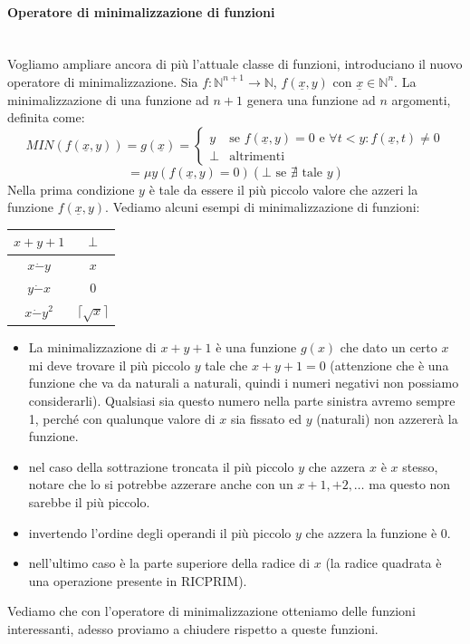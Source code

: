 \documentclass{article}
\begin{document}
\paragraph{Operatore di minimalizzazione di funzioni}\mbox{}\\
Vogliamo ampliare ancora di più l'attuale classe di funzioni, introduciano il nuovo operatore
di minimalizzazione.
Sia $f:\mathbb{N}^{n+1}\rightarrow\mathbb{N}$, $f(\underline{x},y)$ con
$\underline{x}\in\mathbb{N}^n$. La minimalizzazione di una funzione ad $n+1$ genera una
funzione ad $n$ argomenti, definita come:
\[
    MIN(f(\underline{x},y))=g(\underline{x})=
    \begin{cases}
        y    & \text{se }f(\underline{x},y)=0\text{ e }\forall t<y:f(\underline{x},t)\neq 0 \\
        \bot & \text{altrimenti}
    \end{cases}
\]
$$= \mu y(f(\underline{x},y)=0) (\bot\text{ se }\nexists \text{ tale }y)$$
Nella prima condizione $y$ è tale da essere il più piccolo valore
che azzeri la funzione $f(\underline{x},y)$. Vediamo alcuni esempi di minimalizzazione
di funzioni:
\begin{center}
    \begin{tabular}{c|c}
        \toprule
        $x+y+1$       & $\bot$                 \\
        \midrule
        $x\dot{-}y$   & $x$                    \\
        \midrule
        $y\dot{-}x$   & $0$                    \\
        \midrule
        $x\dot{-}y^2$ & $\lceil\sqrt{x}\rceil$ \\
        \bottomrule
    \end{tabular}
\end{center}

\begin{itemize}
    \item La minimalizzazione di $x+y+1$ è una funzione $g(x)$ che dato un certo $x$ mi deve
          trovare il più piccolo $y$ tale che $x+y+1=0$ (attenzione che è una funzione
          che va da naturali a naturali, quindi i numeri negativi non possiamo considerarli).
          Qualsiasi sia questo numero nella parte sinistra avremo sempre 1, perché con qualunque
          valore di $x$ sia fissato ed $y$ (naturali) non azzererà la funzione.

    \item nel caso della sottrazione troncata il più piccolo $y$ che azzera $x$ è $x$ stesso,
          notare che lo si potrebbe azzerare anche con un $x+1,+2,\dots$ ma questo non sarebbe il più piccolo.

    \item invertendo l'ordine degli operandi il più piccolo $y$ che azzera la funzione è 0.

    \item nell'ultimo caso è la parte superiore della radice di $x$ (la radice quadrata
          è una operazione presente in RICPRIM).

\end{itemize}
Vediamo che con l'operatore di minimalizzazione otteniamo delle funzioni interessanti,
adesso proviamo a chiudere rispetto a queste funzioni.
\end{document}
